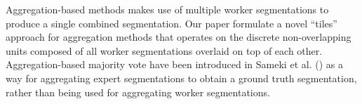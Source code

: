 Aggregation-based methods makes use of multiple worker segmentations to produce a single combined segmentation. Our paper formulate a novel ``tiles'' approach for aggregation methods that operates on the discrete non-overlapping units composed of all worker segmentations overlaid on top of each other. Aggregation-based majority vote have been introduced in Sameki et al. (\citeyear{Sameki2015}) as a way for aggregating expert segmentations to obtain a ground truth segmentation, rather than being used for aggregating worker segmentations. 